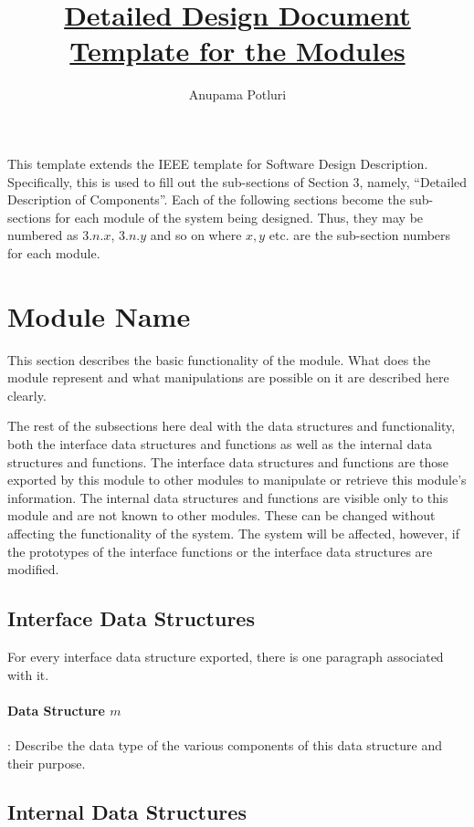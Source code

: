 \documentclass[a4paper,11pt]{article}
\date{}
\author{Anupama Potluri}
\title{\textbf{\underline{Detailed Design Document Template for the Modules}}}
\begin{document}
\maketitle

This template extends the IEEE template for Software Design Description. Specifically, this is used to fill out the sub-sections of Section 3, namely, ``Detailed Description of Components''. Each of the following sections become the sub-sections for each module of the system being designed. Thus, they may be numbered as $3.n.x$, $3.n.y$ and so on where $x, y$ etc. are the sub-section numbers for each module.

\section{Module Name}

This section describes the basic functionality of the module. What does the module represent and what manipulations are possible on it are described here clearly.

The rest of the subsections here deal with the data structures and functionality, both the interface data structures and functions as well as the internal data structures and functions. The interface data structures and functions are those exported by this module to other modules to manipulate or retrieve this module's information. The internal data structures and functions are visible only to this module and are not known to other modules. These can be changed without affecting the functionality of the system. The system will be affected, however, if the prototypes of the interface functions or the interface data structures are modified.

\subsection{Interface Data Structures}

For every interface data structure exported, there is one paragraph associated with it.

\paragraph{Data Structure $m$}: Describe the data type of the various components of this data structure and their purpose. 

\subsection{Internal Data Structures}
\end{document}

